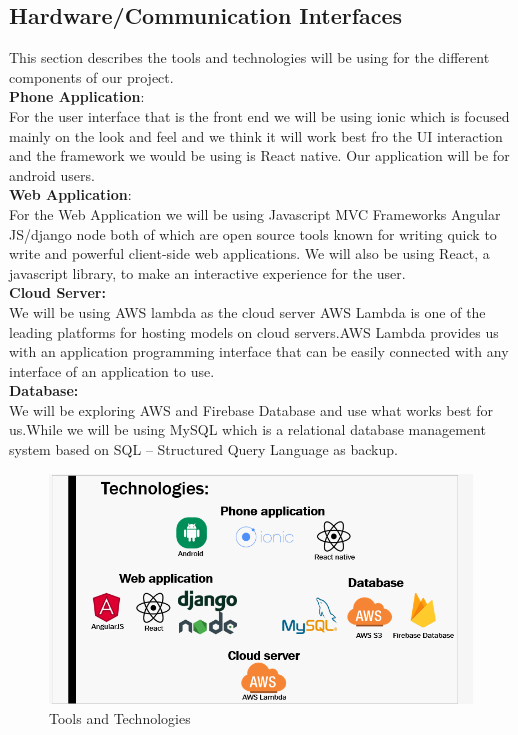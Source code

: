 \subsection{Hardware/Communication Interfaces}
This section describes the tools and technologies will be using for the different components of our project.\\
\textbf{Phone Application}:\\
For the user interface that is the front end we will be using ionic which is focused mainly on the look and feel and we think it will work best fro the UI interaction and the framework we would be using is React native. Our application will be for android users.\\
\textbf{Web Application}:\\
For the Web Application we will be using Javascript MVC Frameworks Angular JS/django node both of which are open source tools known for writing quick to write and powerful client-side web applications. We will also be using React, a javascript library, to make an interactive experience for the user.\\
\textbf{Cloud Server:}\\
We will be using AWS lambda as the cloud server AWS Lambda is one of the leading platforms for hosting models on cloud servers.AWS Lambda provides us with an application programming interface that can be easily connected with any interface of an application to use.\\
\textbf{Database:} \\
We will be exploring AWS and Firebase Database and use what works best for us.While we will be using MySQL which is a relational database management system based on SQL – Structured Query Language as backup.
\begin{figure}[!hb]
   \centering

   \includegraphics[scale=0.5]{images/Tech.PNG}

 
   \caption{Tools and Technologies}\label{fig:picture}
\end{figure}
\newpage
